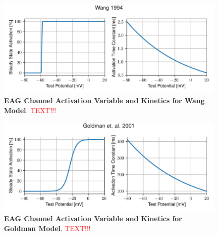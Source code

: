 \documentclass[../main.tex]{subfiles}
\begin{document}
\begin{figure}[!b]
    \centering
    \includegraphics[width=0.8\linewidth]{../img/spiking_to_bursting/eag_wang.png}
    \caption[EAG Channel Activation Variable and Kinetics for Wang Model]{
        \textbf{EAG Channel Activation Variable and Kinetics for Wang Model}. \textcolor{red}{TEXT!!!}
    }
    \label{fig:spiking_to_bursting_eag_params_wang}
\end{figure}

\begin{figure}[!t]
    \centering
    \includegraphics[width=0.8\linewidth]{../img/spiking_to_bursting/eag_goldman.png}
    \caption[EAG Channel Activation Variable and Kinetics for Goldman Model]{
        \textbf{EAG Channel Activation Variable and Kinetics for Goldman Model}. \textcolor{red}{TEXT!!!}
    }
    \label{fig:spiking_to_bursting_eag_params_goldman}
\end{figure}
\end{document}
